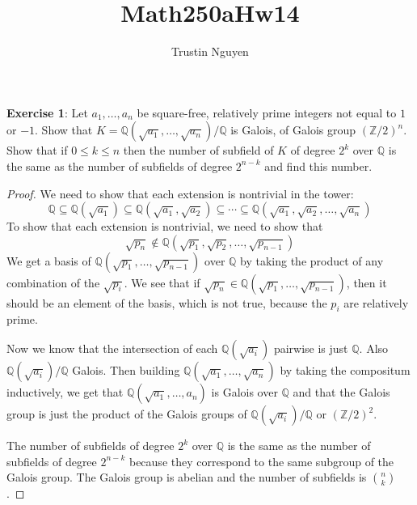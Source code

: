 \documentclass{article}
\title{Math250aHw14}
\author{Trustin Nguyen}
\begin{document}
    \maketitle

\reversemarginpar

\textbf{Exercise 1}: Let $a_{1}, \ldots, a_{ n}$ be square-free, relatively prime integers not equal to $1$ or $-1$. Show that $K = \mathbb{Q}(\sqrt{a_{1}}, \ldots, \sqrt{ a_{n}})/\mathbb{Q}$ is Galois, of Galois group $(\mathbb{Z}/2)^{n}$. Show that if $0 \leq k \leq  n$ then the number of subfield of $K$ of degree $2^{k}$ over $\mathbb{Q}$ is the same as the number of subfields of degree $2^{n  - k}$ and find this number.
    \begin{proof}
        We need to show that each extension is nontrivial in the tower:
            \begin{equation*}
                \mathbb{Q} \subseteq \mathbb{ Q}(\sqrt{a_{1}}) \subseteq \mathbb{ Q}(\sqrt{a_{1}}, \sqrt{a_{2}}) \subseteq \cdots \subseteq  \mathbb{ Q}(\sqrt{a_{1}}, \sqrt{a_{2}}, \ldots, \sqrt{a_{n}})
            \end{equation*}
        To show that each extension is nontrivial, we need to show that 
            \begin{equation*}
                \sqrt{p_{n}} \notin \mathbb{ Q}(\sqrt{p_{1}}, \sqrt{p_{2}}, \ldots, \sqrt{p_{n - 1}})
            \end{equation*}
        We get a basis of $\mathbb{Q}(\sqrt{p_{1}}, \ldots, \sqrt{p_{n - 1}})$ over $\mathbb{Q}$ by taking the product of any combination of the $\sqrt{p_{i}}$. We see that if $\sqrt{p_{n}} \in \mathbb{ Q}(\sqrt{p_{1}}, \ldots, \sqrt{p_{n - 1}})$, then it should be an element of the basis, which is not true, because the $p_{i}$ are relatively prime.

        Now we know that the intersection of each $\mathbb{Q}(\sqrt{a_{i}})$ pairwise is just $\mathbb{Q}$. Also $\mathbb{Q}(\sqrt{a_{i}})/\mathbb{Q}$ Galois. Then building $\mathbb{Q}(\sqrt{a_{1}}, \ldots, \sqrt{a_{n}})$ by taking the compositum inductively, we get that $\mathbb{Q}(\sqrt{a_{1}}, \ldots, a_{n})$ is Galois over $\mathbb{Q}$ and that the Galois group is just the product of the Galois groups of $\mathbb{Q}(\sqrt{a_{i}}) /\mathbb{Q}$ or $(\mathbb{Z}/2)^{2}$.

        The number of subfields of degree $2^{k}$ over $\mathbb{Q}$ is the same as the number of subfields of degree $2^{n - k}$ because they correspond to the same subgroup of the Galois group. The Galois group is abelian and the number of subfields is $\binom{n}{k}$.
    \end{proof}
\end{document}
